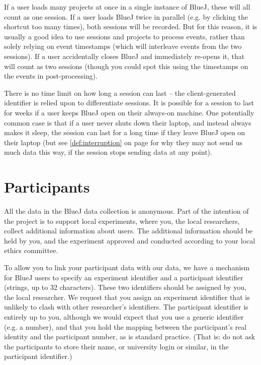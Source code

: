 \documentclass{report}
\newcommand{\myref}[1]{\autoref{#1} on page \pageref*{#1}}
\begin{document}
If a user loads many projects at once in a single instance of BlueJ, these
will all count as one session.  If a user loads BlueJ twice in parallel
(e.g. by clicking the shortcut too many times), both sessions will be
recorded.  But for this reason, it is usually a good idea to use sessions and projects to
process events, rather than solely relying on event timestamps (which will
interleave events from the two sessions).  If a user accidentally closes BlueJ
and immediately re-opens it, that will count as two sessions (though you could
spot this using the timestamps on the events in post-processing).

There is no time limit on how long a session can last -- the client-generated
identifier is relied upon to differentiate sessions.  It is possible for a
session to last for weeks if a user keeps BlueJ open on their always-on
machine.  One potentially common case is that if a user never shuts down their
laptop, and instead always makes it sleep, the session can last for a long
time if they leave BlueJ open on their laptop (but see
\myref{def:interruption} for why they may not send us much data this way, if the session
stops sending data at any point).

\section{Participants}
\label{sec:participants}

All the data in the BlueJ data collection is anonymous.  Part of the intention
of the project is to support local experiments, where you, the local
researchers, collect additional information about users.  The additional
information should be held by you, and the experiment approved and conducted
according to your local ethics committee.

To allow you to link your participant data with our data, we have a mechanism
for BlueJ users to specify an experiment identifier and a participant
identifier (strings, up to 32 characters).  These two identifiers should be
assigned by you, the local researcher.  We request that you assign an
experiment identifier that is unlikely to clash with other researcher's
identifiers.  The participant identifier is entirely up to you, although we
would expect that you use a generic identifier (e.g. a number), and that you
hold the mapping between the participant's real identity and the participant
number, as is standard practice.  (That is: do not ask the participants to store their name, or
university login or similar, in the participant identifier.)
\end{document}
